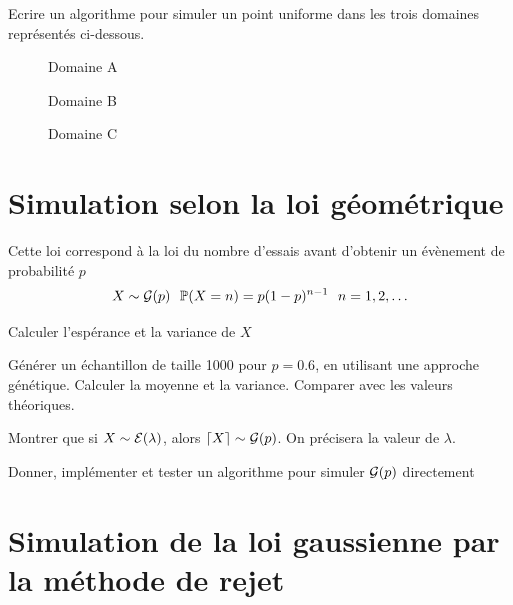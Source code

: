 Ecrire un algorithme pour simuler un point uniforme dans les trois
domaines représentés ci-dessous.

\begin{figure}
\centering
{}
\caption{Domaine A}\label{V-fig-ex1-eps-converted-to.pdf}
\end{figure}

\begin{figure}
\centering
{}
\caption{Domaine B}\label{V-fig-ex2-eps-converted-to.pdf}
\end{figure}

\begin{figure}
\centering
{}
\caption{Domaine C}\label{V-fig-ex3-eps-converted-to.pdf}
\end{figure}

\section{Simulation selon la loi
géométrique}\label{V-simulation-selon-la-loi-guxe9omuxe9trique}

Cette loi correspond à la loi du nombre d'essais avant d'obtenir un
évènement de probabilité \(p\)
\[X\sim{\cal G} (p)~~\mathbb{P}(X=n)=p(1-p)^{n-1}~~n=1,2,\ldots\]

\label{V-loigeom1}
Calculer l'espérance et la variance de \(X\)

\label{V-loigeom2}
Générer un échantillon de taille 1000 pour \(p=0.6\), en utilisant une
approche génétique. Calculer la moyenne et la variance. Comparer avec
les valeurs théoriques.

\label{V-loigeom3}
Montrer que si \(X\sim{\cal E}(\lambda)\), alors
\(\lceil X \rceil \sim{\cal G}(p)\). On précisera la valeur de
\(\lambda\).

\label{V-loigeom4}
Donner, implémenter et tester un algorithme pour simuler \({\cal G}(p)\)
directement

\section{Simulation de la loi gaussienne par la méthode de
rejet}\label{V-simulation-de-la-loi-gaussienne-par-la-muxe9thode-de-rejet}

